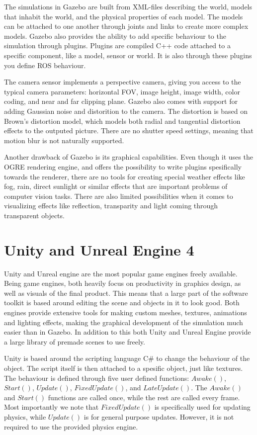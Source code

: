 The simulations in Gazebo are built from XML-files describing the world, models that inhabit the world, and the physical properties of each model. The models can be attached to one another through joints and links to create more complex models. Gazebo also provides the ability to add specific behaviour to the simulation through plugins. Plugins are compiled C++ code attached to a specific component, like a model, sensor or world. It is also through these plugins you define ROS behaviour.

The camera sensor implements a perspective camera, giving you access to the typical camera parameters: horizontal FOV, image height, image width, color coding, and near and far clipping plane. Gazebo also comes with support for adding Gaussian noise and distorition to the camera. The distortion is based on Brown's distortion model, which models both radial and tangential distortion effects to the outputed picture. There are no shutter speed settings, meaning that motion blur is not naturally supported.

Another drawback of Gazebo is its graphical capabilities. Even though it uses the OGRE rendering engine, and offers the possibility to write plugins spesifically towards the renderer, there are no tools for creating special weather effects like fog, rain, direct sunlight or similar effects that are important problems of computer vision tasks. There are also limited possibilities when it comes to visualizing effects like reflection, transparity and light coming through transparent objects.

\section{Unity and Unreal Engine 4}

Unity and Unreal engine are the most popular game engines freely available. Being game engines, both heavily focus on productivity in graphics design, as well as visuals of the final product. This means that a large part of the software toolkit is based around editing the scene and objects in it to look good. Both engines provide extensive tools for making custom meshes, textures, animations and lighting effects, making the graphical development of the simulation much easier than in Gazebo. In addition to this both Unity and Unreal Engine provide a large library of premade scenes to use freely.

Unity is based around the scripting language C\# to change the behaviour of the object. The script itself is then attached to a spesific object, just like textures. The behaviour is defined through five user defined functions: $Awake()$, $Start()$, $Update()$, $FixedUpdate()$, and $LateUpdate()$. The $Awake()$ and $Start()$ functions are called once, while the rest are called every frame. Most importantly we note that $FixedUpdate()$ is specifically used for updating physics, while $Update()$ is for general purpose updates. However, it is not required to use the provided physics engine.

